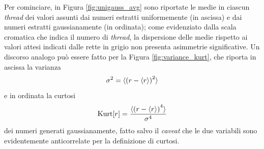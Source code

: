 Per cominciare, in Figura \ref{fig:unigauss_avg} sono riportate le medie in ciascun \textit{thread} dei valori assunti dai numeri estratti uniformemente (in ascissa) e dai numeri estratti gaussianamente (in ordinata); come evidenziato dalla scala cromatica che indica il numero di \textit{thread}, la dispersione delle medie rispetto ai valori attesi indicati dalle rette in grigio non presenta asimmetrie significative. Un discorso analogo può essere fatto per la Figura \ref{fig:variance_kurt}, che riporta in ascissa la varianza
\begin{equation}
    \sigma^2 = \braket{{\left(r-\braket{r}\right)}^2}
    \label{eq:variance}
\end{equation}
e in ordinata la curtosi
\begin{equation}
    \text{Kurt}[r] = \frac{\braket{{\left(r-\braket{r}\right)}^4}}{\sigma^4}
    \label{eq:kurtosis}
\end{equation}
dei numeri generati gaussianamente, fatto salvo il \textit{caveat} che le due variabili sono evidentemente anticorrelate per la definizione di curtosi.

